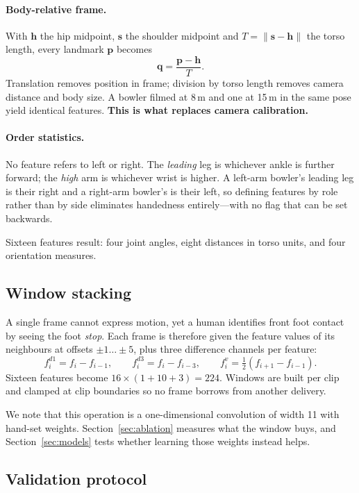 \documentclass[11pt,a4paper]{article}
\begin{document}
\paragraph{Body-relative frame.} With $\mathbf{h}$ the hip midpoint,
$\mathbf{s}$ the shoulder midpoint and $T = \lVert \mathbf{s} - \mathbf{h}
\rVert$ the torso length, every landmark $\mathbf{p}$ becomes
\[
  \mathbf{q} = \frac{\mathbf{p} - \mathbf{h}}{T}.
\]
Translation removes position in frame; division by torso length removes camera
distance and body size. A bowler filmed at 8\,m and one at 15\,m in the same
pose yield identical features. \textbf{This is what replaces camera
calibration.}

\paragraph{Order statistics.} No feature refers to left or right. The
\emph{leading} leg is whichever ankle is further forward; the \emph{high} arm
is whichever wrist is higher. A left-arm bowler's leading leg is their right
and a right-arm bowler's is their left, so defining features by role rather
than by side eliminates handedness entirely---with no flag that can be set
backwards.

Sixteen features result: four joint angles, eight distances in torso units,
and four orientation measures.

\subsection{Window stacking}

A single frame cannot express motion, yet a human identifies front foot contact
by seeing the foot \emph{stop}. Each frame is therefore given the feature
values of its neighbours at offsets $\pm 1 \dots \pm 5$, plus three difference
channels per feature:
\[
  f^{d1}_i = f_i - f_{i-1}, \qquad
  f^{d3}_i = f_i - f_{i-3}, \qquad
  f^{v}_i  = \tfrac{1}{2}\left(f_{i+1} - f_{i-1}\right).
\]
Sixteen features become $16 \times (1 + 10 + 3) = 224$. Windows are built per
clip and clamped at clip boundaries so no frame borrows from another delivery.

We note that this operation is a one-dimensional convolution of width 11 with
hand-set weights. Section~\ref{sec:ablation} measures what the window buys, and
Section~\ref{sec:models} tests whether learning those weights instead helps.

\subsection{Validation protocol}
\label{sec:protocol}
\end{document}
